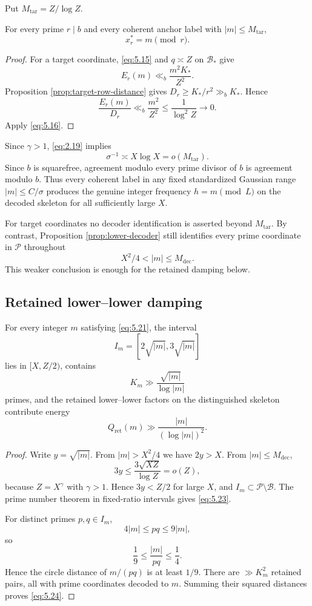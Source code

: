 Put $M_{\mathrm{tar}}=Z/\log Z$.

\begin{proposition}\label{prop:target-decoder}
For every prime $r\mid b$ and every coherent anchor label with $|m|\le M_{\mathrm{tar}}$,
\[
x_r^*=m\pmod r.
\tag{5.19}\label{eq:5.19}
\]
\end{proposition}

\begin{proof}
For a target coordinate, \eqref{eq:5.15} and $q\asymp Z$ on $\mathcal B_*$ give
\[
E_r(m)
\ll_b
\frac{m^2K_*}{Z^2}.
\]
Proposition \ref{prop:target-row-distance} gives $D_r\ge K_*/r^2\gg_bK_*$. Hence
\[
\frac{E_r(m)}{D_r}
\ll_b\frac{m^2}{Z^2}
\le\frac1{\log^2Z}
\longrightarrow0.
\]
Apply \eqref{eq:5.16}.
\end{proof}

Since $\gamma>1$, \eqref{eq:2.19} implies
\[
\sigma^{-1}\asymp X\log X=o(M_{\mathrm{tar}}).
\tag{5.20}\label{eq:5.20}
\]
Since $b$ is squarefree, agreement modulo every prime divisor of $b$ is agreement modulo $b$. Thus every coherent label in any fixed standardized Gaussian range $|m|\le C/\sigma$ produces the genuine integer frequency $h=m\pmod L$ on the decoded skeleton for all sufficiently large $X$.

For target coordinates no decoder identification is asserted beyond $M_{\mathrm{tar}}$. By contrast, Proposition \ref{prop:lower-decoder} still identifies every prime coordinate in $\mathcal P$ throughout
\[
X^2/4<|m|\le M_{\mathrm{dec}}.
\tag{5.21}\label{eq:5.21}
\]
This weaker conclusion is enough for the retained damping below.

\subsection{Retained lower--lower damping}

\begin{proposition}\label{prop:adaptive-damping}
For every integer $m$ satisfying \eqref{eq:5.21}, the interval
\[
I_m=[2\sqrt{|m|},3\sqrt{|m|}]
\tag{5.22}\label{eq:5.22}
\]
lies in $[X,Z/2)$, contains
\[
K_m\gg\frac{\sqrt{|m|}}{\log|m|}
\tag{5.23}\label{eq:5.23}
\]
primes, and the retained lower--lower factors on the distinguished skeleton contribute energy
\[
Q_{\mathrm{ret}}(m)
\gg
\frac{|m|}{(\log|m|)^2}.
\tag{5.24}\label{eq:5.24}
\]
\end{proposition}

\begin{proof}
Write $y=\sqrt{|m|}$. From $|m|>X^2/4$ we have $2y>X$. From $|m|\le M_{\mathrm{dec}}$,
\[
3y
\le
\frac{3\sqrt{XZ}}{\log Z}
=o(Z),
\]
because $Z=X^\gamma$ with $\gamma>1$. Hence $3y<Z/2$ for large $X$, and $I_m\subset\mathcal P\setminus\mathcal B$. The prime number theorem in fixed-ratio intervals gives \eqref{eq:5.23}.

For distinct primes $p,q\in I_m$,
\[
4|m|\le pq\le9|m|,
\]
so
\[
\frac19\le\frac{|m|}{pq}\le\frac14.
\]
Hence the circle distance of $m/(pq)$ is at least $1/9$. There are $\gg K_m^2$ retained pairs, all with prime coordinates decoded to $m$. Summing their squared distances proves \eqref{eq:5.24}.
\end{proof}

